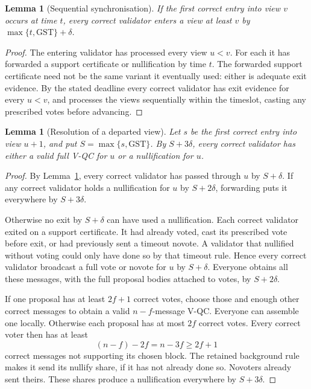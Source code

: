 \documentclass[11pt,a4paper]{article}
\newtheorem{lemma}[theorem]{Lemma}
\theoremstyle{definition}
\newcommand{\GST}{\mathrm{GST}}
\begin{document}
\begin{lemma}[Sequential synchronisation]\label{lem:sync}
If the first correct entry into view \(v\) occurs at time \(t\), every
correct validator enters a view at least \(v\) by
\(\max\{t,\GST\}+\delta\).
\end{lemma}
\begin{proof}
The entering validator has processed every view \(u<v\). For each it has
forwarded a support certificate or nullification by time \(t\). The
forwarded support certificate need not be the same variant it eventually
used: either is adequate exit evidence. By the stated deadline every
correct validator has exit evidence for every \(u<v\), and processes the
views sequentially within the timeslot, casting any prescribed votes
before advancing.
\end{proof}

\begin{lemma}[Resolution of a departed view]\label{lem:resolve}
Let \(s\) be the first correct entry into view \(u+1\), and put
\(S=\max\{s,\GST\}\). By \(S+3\delta\), every correct validator has
either a valid full V-QC for \(u\) or a nullification for \(u\).
\end{lemma}
\begin{proof}
By Lemma~\ref{lem:sync}, every correct validator has passed through \(u\)
by \(S+\delta\). If any correct validator holds a nullification for \(u\)
by \(S+2\delta\), forwarding puts it everywhere by \(S+3\delta\).

Otherwise no exit by \(S+\delta\) can have used a nullification. Each
correct validator exited on a support certificate. It had already voted,
cast its prescribed vote before exit, or had previously sent a timeout
novote. A validator that nullified without voting could only have done so
by that timeout rule. Hence every correct validator broadcast a full vote
or novote for \(u\) by \(S+\delta\). Everyone obtains all these messages,
with the full proposal bodies attached to votes, by \(S+2\delta\).

If one proposal has at least \(2f+1\) correct votes, choose those and enough
other correct messages to obtain a valid \(n-f\)-message V-QC. Everyone
can assemble one locally. Otherwise each proposal has at most \(2f\)
correct votes. Every correct voter then has at least
\[
  (n-f)-2f=n-3f\ge2f+1
\]
correct messages not supporting its chosen block. The retained background
rule makes it send its nullify share, if it has not already done so.
Novoters already sent theirs. These shares produce a nullification
everywhere by \(S+3\delta\).
\end{proof}
\end{document}
